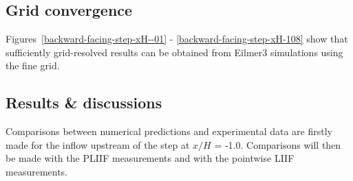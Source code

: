 \subsection{Grid convergence}
%
Figures~\ref{backward-facing-step-xH--01} - \ref{backward-facing-step-xH-108}
show that sufficiently grid-resolved results can be obtained from Eilmer3 simulations
using the fine grid.

\subsection{Results \& discussions}
\label{backward-facing-step-results}
%
Comparisons between numerical predictions and experimental data are firstly
made for the inflow upstream of the step at $x/H$ = -1.0. Comparisons will then
be made with the PLIIF measurements and with the pointwise LIIF measurements.

